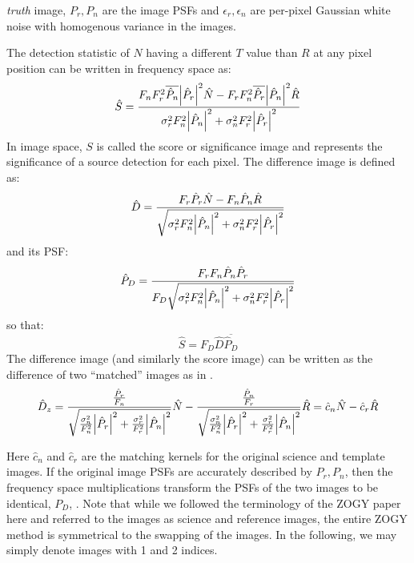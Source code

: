\documentclass[11pt]{article}
\begin{document}
\emph{truth} image, \(P_r, P_n\) are the image PSFs and \(\epsilon_r,
\epsilon_n\) are per-pixel Gaussian white noise with homogenous variance in
the images.
%
\par The detection statistic of \(N\) having a different \(T\) value than \(R\)
at any pixel position can be written in frequency space as:
\begin{equation}
  \hat{S} = \frac{F_nF_r^2\overline{\hat{P}_n}\abs{\hat{P}_r}^2 \hat{N}
 - F_rF_n^2\overline{\hat{P}_r}\abs{\hat{P}_n}^2 \hat{R}
}
{ \sigma_r^2F_n^2\abs{\hat{P}_n}^2 + \sigma_n^2F_r^2\abs{\hat{P}_r}^2 }
\label{eq:S}
\end{equation}
In image space, \(S\) is called the score or significance image and
represents the significance of a source detection for each pixel.
%
The difference image is defined as:
\begin{equation}
\hat{D} = \frac{F_r \hat{P}_r\hat{N} - F_n \hat{P}_n \hat{R}}
{\sqrt{\sigma_r^2F_n^2\abs{\hat{P}_n}^2 + \sigma_n^2F_r^2\abs{\hat{P}_r}^2}}
\label{eq:Dhat}
\end{equation}
and its PSF:
\begin{equation}
\hat{P}_D = \frac{F_rF_n\hat{P}_n\hat{P}_r}
{F_D\sqrt{\sigma_r^2F_n^2\abs{\hat{P}_n}^2 +
    \sigma_n^2F_r^2\abs{\hat{P}_r}^2}}
\label{eq:Pdhat}
\end{equation}
so that:
\begin{equation}
\hat{S} = F_D\hat{D}\overline{\hat{P}_D}
\label{eq:Shat}
\end{equation}
The difference image (and similarly the score image) can be written as the
difference of two ``matched'' images as in .
\begin{equation}
\hat{D}_z = \frac{\frac{\hat{P}_r}{F_n}}
{\sqrt{\frac{\sigma_n^2}{F_n^2}\abs{\hat{P}_r}^2
 + \frac{\sigma_r^2}{F_r^2}\abs{\hat{P}_n}^2}}
\hat{N} -
\frac{\frac{\hat{P}_n}{F_r}}
{\sqrt{\frac{\sigma_n^2}{F_n^2}\abs{\hat{P}_r}^2
 + \frac{\sigma_r^2}{F_r^2}\abs{\hat{P}_n}^2}}
\hat{R}
=
\hat{c}_n \hat{N} - \hat{c}_r\hat{R}
\label{eq:c1N_c2R}
\end{equation}
%
\par Here \(\hat{c}_n\) and \(\hat{c}_r\) are the matching kernels for
the original science and template images. If the original image PSFs
are accurately described by \(P_r, P_n\), then the frequency space
multiplications transform the PSFs of the two images to be identical,
\(P_D\), . Note that while we followed the terminology
of the ZOGY paper here and referred to the images as science and
reference images, the entire ZOGY method is symmetrical to the swapping
of the images. In the following, we may simply denote images with 1
and 2 indices.
%
\end{document}
